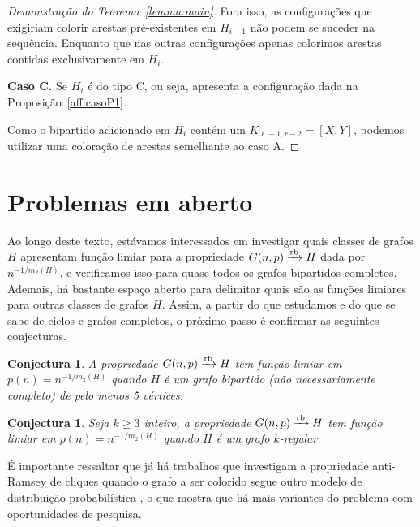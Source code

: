 \documentclass[12pt,a4paper]{book}
\newcommand{\K}{K_{\ell,r}} %
\def\rbarrow{\xrightarrow[]{\raisebox{0.0mm}[0mm]{$\scriptstyle \rm rb$}}}
\newtheorem{conjectura}[teorema] {Conjectura}
\begin{document}
\begin{proof}[Demonstração do Teorema~\ref{lemma:main}]
 
        Fora isso, as configurações que exigiriam colorir arestas pré-existentes em $H_{i-1}$ não podem se suceder na sequência.
        Enquanto que nas outras configurações apenas colorimos arestas contidas exclusivamente em $H_{i}$.

        \medskip \textbf{Caso C.} Se $H_i$ é do tipo C, ou seja, apresenta a configuração dada na Proposição~\ref{aff:casoP1}.

        Como o bipartido adicionado em $H_i$ contém um $K_{\ell-1,r-2}=[X,Y]$, podemos utilizar uma coloração de arestas semelhante ao caso A.
        
     \end{proof}
 
  
  
\section{Problemas em aberto}
\label{subsec:bipartido-prob}
Ao longo deste texto, estávamos interessados em investigar quais classes de grafos $H$ apresentam função limiar para a propriedade $G(n,p)\rbarrow H$  dada por $n^{-1/m_2(H)}$, 
e verificamos isso para quase todos os grafos bipartidos completos.
Ademais, há bastante espaço aberto para delimitar quais são as funções limiares para outras classes de grafos $H$. 
Assim, a partir do que estudamos e do que se sabe de ciclos e grafos completos, o próximo passo é confirmar as seguintes conjecturas. %



\begin{conjectura}\label{conj:antibipartidos}
     A propriedade $G(n,p)\rbarrow H$ tem função limiar em  $p(n) =  n^{-1/m_2(H)}$ quando $H$ é um grafo bipartido (não necessariamente completo) de pelo menos 5 vértices.
\end{conjectura}

\begin{conjectura}\label{conj:antiregulares}
     Seja $k \geq 3$ inteiro, a propriedade $G(n,p)\rbarrow H$ tem função limiar em  $p(n) =  n^{-1/m_2(H)}$ quando $H$ é um grafo $k$-regular.
\end{conjectura}

É importante ressaltar que já há trabalhos  que investigam a propriedade anti-Ramsey de cliques quando o grafo a ser colorido segue outro modelo de distribuição probabilística \cite{aigner2022large, aigner2022small}, o que mostra que há mais variantes do problema com oportunidades de pesquisa.
\end{document}
